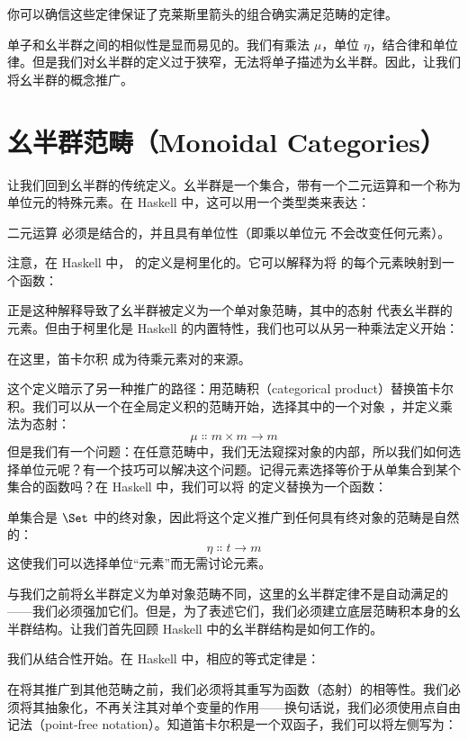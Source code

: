 \noindent
你可以确信这些定律保证了克莱斯里箭头的组合确实满足范畴的定律。

单子和幺半群之间的相似性是显而易见的。我们有乘法 $\mu$，单位 $\eta$，结合律和单位律。但是我们对幺半群的定义过于狭窄，无法将单子描述为幺半群。因此，让我们将幺半群的概念推广。

\section{幺半群范畴（Monoidal Categories）}

让我们回到幺半群的传统定义。幺半群是一个集合，带有一个二元运算和一个称为单位元的特殊元素。在 Haskell 中，这可以用一个类型类来表达：

二元运算  必须是结合的，并且具有单位性（即乘以单位元  不会改变任何元素）。

注意，在 Haskell 中， 的定义是柯里化的。它可以解释为将  的每个元素映射到一个函数：

正是这种解释导致了幺半群被定义为一个单对象范畴，其中的态射  代表幺半群的元素。但由于柯里化是 Haskell 的内置特性，我们也可以从另一种乘法定义开始：

在这里，笛卡尔积  成为待乘元素对的来源。

这个定义暗示了另一种推广的路径：用范畴积（categorical product）替换笛卡尔积。我们可以从一个在全局定义积的范畴开始，选择其中的一个对象 ，并定义乘法为态射：
\[\mu \Colon m\times{}m \to m\]
但是我们有一个问题：在任意范畴中，我们无法窥探对象的内部，所以我们如何选择单位元呢？有一个技巧可以解决这个问题。记得元素选择等价于从单集合到某个集合的函数吗？在 Haskell 中，我们可以将  的定义替换为一个函数：

单集合是 $\Set$ 中的终对象，因此将这个定义推广到任何具有终对象的范畴是自然的：
\[\eta \Colon t \to m\]
这使我们可以选择单位“元素”而无需讨论元素。

与我们之前将幺半群定义为单对象范畴不同，这里的幺半群定律不是自动满足的——我们必须强加它们。但是，为了表述它们，我们必须建立底层范畴积本身的幺半群结构。让我们首先回顾 Haskell 中的幺半群结构是如何工作的。

我们从结合性开始。在 Haskell 中，相应的等式定律是：

在将其推广到其他范畴之前，我们必须将其重写为函数（态射）的相等性。我们必须将其抽象化，不再关注其对单个变量的作用——换句话说，我们必须使用点自由记法（point-free notation）。知道笛卡尔积是一个双函子，我们可以将左侧写为：

